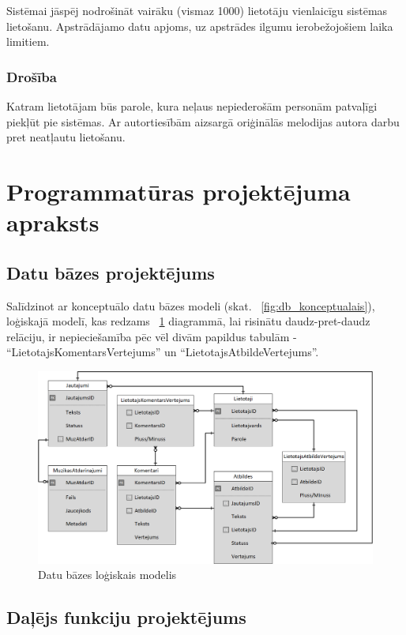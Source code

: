 \documentclass[12pt]{article}
\begin{document}
Sistēmai jāspēj nodrošināt vairāku (vismaz 1000) lietotāju vienlaicīgu sistēmas lietošanu. Apstrādājamo datu apjoms, uz apstrādes ilgumu ierobežojošiem laika limitiem.

\subsubsection{Drošība}

Katram lietotājam būs parole, kura neļaus nepiederošām personām patvaļīgi piekļūt pie sistēmas. Ar autortiesībām aizsargā oriģinālās melodijas autora darbu pret neatļautu lietošanu.

\section{Programmatūras projektējuma apraksts}

\subsection{Datu bāzes projektējums}

Salīdzinot ar konceptuālo datu bāzes modeli (skat. ~\ref{fig:db_konceptualais}), loģiskajā modelī, kas redzams ~\ref{fig:db_logiskais} diagrammā, lai risinātu daudz-pret-daudz relāciju, ir nepieciešamība pēc vēl divām papildus tabulām - ``LietotajsKomentarsVertejums'' un ``LietotajsAtbildeVertejums''.

\begin{figure}[H]
\begin{center}
	\includegraphics[scale=0.4]{DB_logical.png}
	\caption{Datu bāzes loģiskais modelis}
	\label{fig:db_logiskais}
\end{center}
\end{figure}

\subsection{Daļējs funkciju projektējums}
\end{document}
